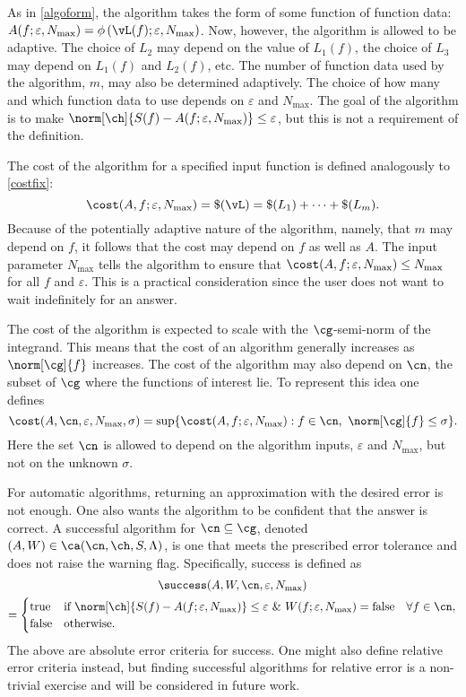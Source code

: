 \documentclass[final]{elsarticle}
\theoremstyle{definition}
\theoremstyle{remark}
\begin{document}
As in \eqref{algoform}, the algorithm takes the form of some function of function data: $A(f;\varepsilon,N_{\max}) = \phi\left(\vL(f);\varepsilon,N_{\max}\right)$.
Now, however, the algorithm is allowed to be adaptive. The choice of $L_2$ may depend on the value of $L_1(f)$, the choice of $L_3$ may depend on $L_1(f)$ and $L_2(f)$, etc.  The number of function data used by the algorithm, $m$, may also be determined adaptively. The choice of how many and which function data to use depends on $\varepsilon$ and $N_{\max}$.  The goal of the algorithm is to make $\norm[\ch]{S(f) - A(f;\varepsilon,N_{\max})} \le \varepsilon$, but this is not a requirement of the definition.

The cost of the algorithm for a specified input function is defined analogously to \eqref{costfix}:
\[
\cost(A,f;\varepsilon,N_{\max}) = \$(\vL) = \$(L_1) + \cdots +\$(L_m).
\]
Because of the potentially adaptive nature of the algorithm, namely, that $m$ may depend on $f$, it follows that the cost may depend on $f$ as well as $A$. The input parameter $N_{\max}$ tells the algorithm to ensure that $\cost(A,f;\varepsilon,N_{\max}) \le N_{\max}$ for all $f$ and $\varepsilon$.  This is a practical consideration since the user does not want to wait indefinitely for an answer.  

The cost of the algorithm is expected to scale with the $\cg$-semi-norm of the integrand.  This means that the cost of an algorithm generally increases as $\norm[\cg]{f}$ increases.  The cost of the algorithm may also depend on $\cn$, the subset of $\cg$ where the functions of interest lie.  To represent this idea one defines
\begin{equation*}
\cost(A,\cn,\varepsilon,N_{\max},\sigma)
= \sup \{ \cost(A,f;\varepsilon,N_{\max}) : f \in \cn, \ \norm[\cg]{f} \le \sigma \} .
\end{equation*}
Here the set $\cn$ is allowed to depend on the algorithm inputs, $\varepsilon$ and $N_{\max}$, but not on the unknown $\sigma$.

For automatic algorithms, returning an approximation with the desired error is not enough.  One also wants the algorithm to be confident that the answer is correct.  A successful algorithm for $\cn \subseteq \cg$, denoted $(A,W) \in \ca(\cn,\ch,S,\Lambda)$, is one that meets the prescribed error tolerance and does not raise the warning flag.  Specifically, success is defined as
\begin{multline*}
\success(A,W,\cn,\varepsilon,N_{\max}) \\
= \begin{cases} \text{true} & \text{if } \displaystyle \norm[\ch]{S(f)-A(f;\varepsilon,N_{\max})} \le \varepsilon \ \& \ W(f;\varepsilon,N_{\max})=\text{false} \quad \forall  f \in \cn, \\
\displaystyle \text{false} & \text{otherwise}.
\end{cases}
\end{multline*}
The above are absolute error criteria for success.  One might also define relative error criteria instead, but finding successful algorithms for relative error is a non-trivial exercise and will be considered in future work.
\end{document}

